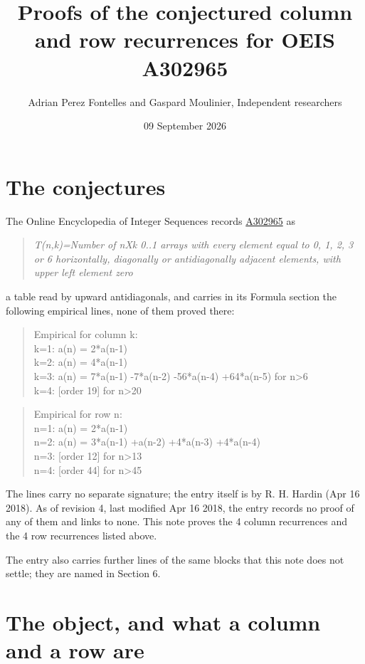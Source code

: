 \documentclass[11pt]{article}
\title{Proofs of the conjectured column and row recurrences for OEIS A302965}
\author{Adrian Perez Fontelles and Gaspard Moulinier, Independent researchers}
\date{09 September 2026}
\theoremstyle{definition}
\begin{document}
\maketitle
\section{The conjectures}

The Online Encyclopedia of Integer Sequences records \href{https://oeis.org/A302965}{A302965} as

\begin{quote}\itshape T(n,k)=Number of nXk 0..1 arrays with every element equal to 0, 1, 2, 3 or 6 horizontally, diagonally or antidiagonally adjacent elements, with upper left element zero\end{quote}

a table read by upward antidiagonals, and carries in its Formula section the following empirical lines, none of them proved there:

\begin{quote}\ttfamily Empirical for column k:\\
k=1: a(n) = 2*a(n-1)\\k=2: a(n) = 4*a(n-1)\\k=3: a(n) = 7*a(n-1) -7*a(n-2) -56*a(n-4) +64*a(n-5) for n>6\\k=4: [order 19] for n>20\end{quote}

\begin{quote}\ttfamily Empirical for row n:\\
n=1: a(n) = 2*a(n-1)\\n=2: a(n) = 3*a(n-1) +a(n-2) +4*a(n-3) +4*a(n-4)\\n=3: [order 12] for n>13\\n=4: [order 44] for n>45\end{quote}

The lines carry no separate signature; the entry itself is by R. H. Hardin (Apr 16 2018). As of revision 4, last modified Apr 16 2018, the entry records no proof of any of them and links to none. This note proves the 4 column recurrences and the 4 row recurrences listed above.

The entry also carries further lines of the same blocks that this note does not settle; they are named in Section 6.

\section{The object, and what a column and a row are}
\end{document}
